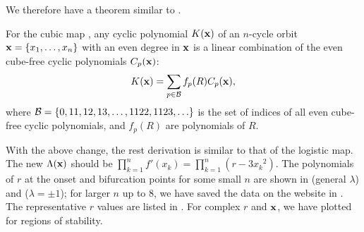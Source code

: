 \documentclass{ws-ijbc}
\begin{document}
We therefore have a theorem similar to .
%
%
\begin{theorem}
  For the cubic map ,
  any cyclic polynomial $K(\mathbf{x})$ of
  an $n$-cycle orbit
  $\mathbf{x} = \{x_1, \ldots, x_n\}$
  with an even degree in $\mathbf{x}$
  is a linear combination of
the even cube-free cyclic polynomials $C_p(\mathbf{x})$:
\[
  K(\mathbf{x}) = \sum_{p \in \mathcal B} f_p(R) C_p(\mathbf{x}),
\]
  where $\mathcal B = \{0, 11, 12, 13, \ldots, 1122, 1123, \ldots \}$ is
  the set of indices of all even cube-free cyclic polynomials,
  and $f_p(R)$ are polynomials of $R$.
  \label{thm:cubfree}
\end{theorem}






With the above change, the rest derivation is similar to that of the logistic map.
The new $\Lambda(\mathbf{x})$ should be
$\prod_{k=1}^n f'(x_k) = \prod_{k=1}^n (r - 3 {x_k}^2)$.
%
The polynomials of $r$
  at the onset and bifurcation points
for some small $n$ are shown in  (general $\lambda$)
and  ($\lambda = \pm1$);
for larger $n$ up to 8,
we have saved the data on the website in .
%
The representative $r$ values are listed in .
%
For complex $r$ and $\mathbf{x}$,
we have plotted  for regions of stability.
\end{document}
